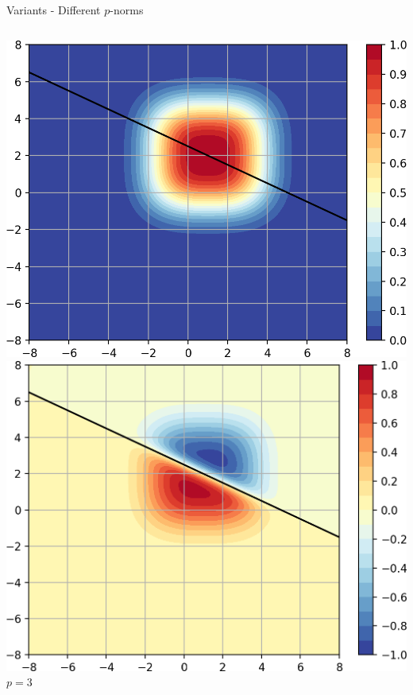 \documentclass{beamer}
\begin{document}
\begin{frame}{Variants - Different $p$-norms}
\begin{columns}
    \begin{column}{.27\textwidth}
            \includegraphics[width=\textwidth]{images/Variants-Norms/ord3_g-cropped.png}\\
            \includegraphics[width=\textwidth]{images/Variants-Norms/ord3-cropped.png}\\
            \centering $p=3$
    \end{column}
    \end{columns}
\end{frame}
\end{document}
